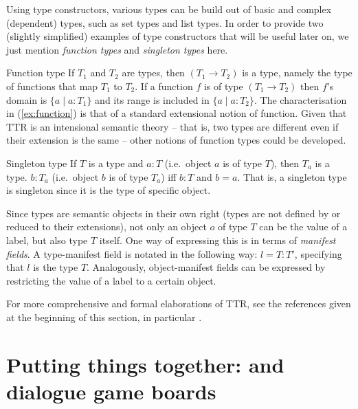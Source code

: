 \documentclass[output=paper
 	        ,biblatex
                ,babelshorthands
                ,newtxmath
                ,draftmode
                ,colorlinks, citecolor=brown
]{langscibook}
\begin{document}
Using type constructors, various types can be build out of basic and complex (dependent) types, such as set types and list types. 
%
In order to provide two (slightly simplified) examples of type constructors that will be useful later on, we just mention \emph{function types} and \emph{singleton types} here.

\ea Function type \label{ex:function}
\ea If $T_1$ and $T_2$ are types, then $(T_1 \rightarrow T_2)$ is a type, namely the type of functions that map $T_1$ to $T_2$.
\ex If a function $f$ is of type $(T_1 \rightarrow T_2)$ then $f$'s domain is $\{a \mid a : T_1\}$ and its range is included in $\{a \mid a : T_2\}$.
\z
\z 
%
The characterisation in (\ref{ex:function}) is that of a standard extensional notion of function. 
%
Given that TTR is an intensional semantic theory -- that is, two types are different even if their extension is the same -- other notions of function types could be developed.


\ea Singleton type
\ea If $T$ is a type and $a : T$ (i.e.\ object $a$ is of type $T$), then $T_a$ is a type.
\ex $b : T_a$ (i.e.\ object $b$ is of type $T_a$) iff $b : T$ and $b = a$.
\z
\z
%
That is, a singleton type is singleton since it is the type of specific object. 

Since types are semantic objects in their own right (types are not defined by or reduced to their extensions), not only an object $o$ of type $T$ can be the value of a label, but also  type $T$ itself.
%
One way of expressing this is in terms of 
\emph{manifest fields}.
%
A type-manifest field is notated in the following way: $l=T : T'$, specifying that $l$ is the type $T$.
%
Analogously, object-manifest fields can be expressed by restricting the value of a label to a certain object.


For more comprehensive and formal elaborations of TTR, see the references given at the beginning of this section, in particular \citet{Cooper:ms}.



\section{Putting things together: \HPSGTTR and dialogue game boards}
\label{sec:hpsgttr-dialogue-game-boards}
\end{document}
